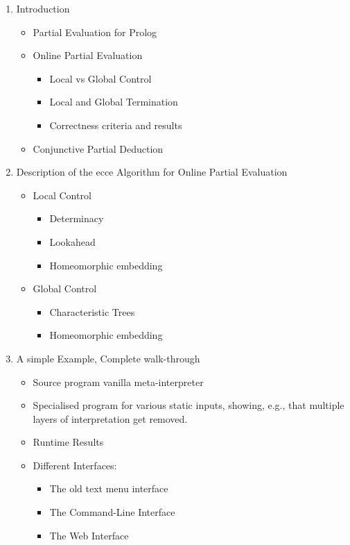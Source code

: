 \documentclass{sig-alternate}
\begin{document}
\begin{enumerate}
\item Introduction
  \begin{itemize}
  \item Partial Evaluation for Prolog
 \item Online Partial Evaluation
        \begin{itemize}
    \item Local vs Global Control
    \item Local and Global Termination
    \item Correctness criteria and results
   \end{itemize}
    \item Conjunctive Partial Deduction
  \end{itemize}
 
 \item Description of the {\sc ecce} Algorithm for Online Partial Evaluation
  \begin{itemize}
    \item Local Control
       \begin{itemize}
    \item Determinacy
    \item Lookahead
    \item Homeomorphic embedding
     \end{itemize}
    \item Global Control
           \begin{itemize}
    \item Characteristic Trees
    \item Homeomorphic embedding
    \end{itemize}
  \end{itemize}
  
  
 \item A simple Example, Complete walk-through
  \begin{itemize}
    \item Source program vanilla meta-interpreter
    \item Specialised program for various static inputs, showing, e.g., 
     that multiple layers of interpretation get removed.
    \item Runtime Results
    \item Different Interfaces:
     \begin{itemize}
    \item The old text menu interface
    \item The Command-Line Interface
    \item The Web Interface
    \end{itemize}
  \end{itemize}
  

\end{enumerate}
\end{document}
